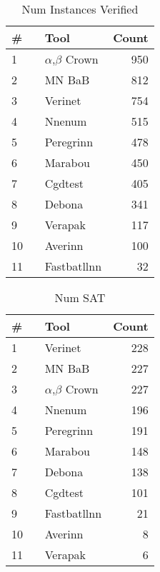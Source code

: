 
\begin{table}[h]
\begin{center}
\caption{Num Instances Verified} \label{tab:stats1}
{\setlength{\tabcolsep}{2pt}
\begin{tabular}[h]{@{}llr@{}}
\toprule
\textbf{\# ~} & \textbf{Tool} & \textbf{Count}\\
\midrule
1 & $\alpha$,$\beta$ Crown & 950 \\
2 & MN BaB & 812 \\
3 & Verinet & 754 \\
4 & Nnenum & 515 \\
5 & Peregrinn & 478 \\
6 & Marabou & 450 \\
7 & Cgdtest & 405 \\
8 & Debona & 341 \\
9 & Verapak & 117 \\
10 & Averinn & 100 \\
11 & Fastbatllnn & 32 \\
\bottomrule
\end{tabular}
}
\end{center}
\end{table}




\begin{table}[h]
\begin{center}
\caption{Num SAT} \label{tab:stats2}
{\setlength{\tabcolsep}{2pt}
\begin{tabular}[h]{@{}llr@{}}
\toprule
\textbf{\# ~} & \textbf{Tool} & \textbf{Count}\\
\midrule
1 & Verinet & 228 \\
2 & MN BaB & 227 \\
3 & $\alpha$,$\beta$ Crown & 227 \\
4 & Nnenum & 196 \\
5 & Peregrinn & 191 \\
6 & Marabou & 148 \\
7 & Debona & 138 \\
8 & Cgdtest & 101 \\
9 & Fastbatllnn & 21 \\
10 & Averinn & 8 \\
11 & Verapak & 6 \\
\bottomrule
\end{tabular}
}
\end{center}
\end{table}



